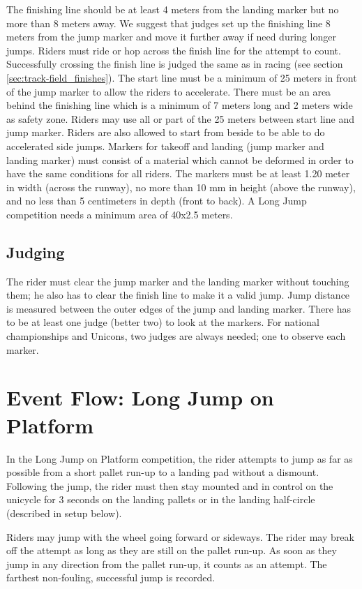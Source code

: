The finishing line should be at least 4 meters from the landing marker but no more than 8 meters away.
We suggest that judges set up the finishing line 8 meters from the jump marker and move it further away if need during longer jumps.
Riders must ride or hop across the finish line for the attempt to count.
Successfully crossing the finish line is judged the same as in racing (see section \ref{sec:track-field_finishes}).
The start line must be a minimum of 25 meters in front of the jump marker to allow the riders to accelerate.
There must be an area behind the finishing line which is a minimum of 7 meters long and 2 meters wide as safety zone.
Riders may use all or part of the 25 meters between start line and jump marker.
Riders are also allowed to start from beside to be able to do accelerated side jumps.
Markers for takeoff and landing (jump marker and landing marker) must consist of a material which cannot be deformed in order to have the same conditions for all riders.
The markers must be at least 1.20 meter in width (across the runway), no more than 10 mm in height (above the runway), and no less than 5 centimeters in depth (front to back).
A Long Jump competition needs a minimum area of 40x2.5 meters.

\subsection{Judging}
The rider must clear the jump marker and the landing marker without touching them; he also has to clear the finish line to make it a valid jump.
Jump distance is measured between the outer edges of the jump and landing marker.
There has to be at least one judge (better two) to look at the markers.
For national championships and Unicons, two judges are always needed; one to observe each marker.

\section{Event Flow: Long Jump on Platform}
In the Long Jump on Platform competition, the rider attempts to jump as far as possible from a short pallet run-up to a landing pad without a dismount.
Following the jump, the rider must then stay mounted and in control on the unicycle for 3 seconds on the landing pallets or in the landing half-circle (described in setup below).

Riders may jump with the wheel going forward or sideways.
The rider may break off the attempt as long as they are still on the pallet run-up.
As soon as they jump in any direction from the pallet run-up, it counts as an attempt.
The farthest non-fouling, successful jump is recorded.

